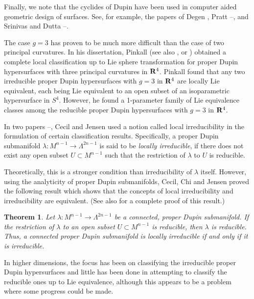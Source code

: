 \documentclass[12pt]{article}
\newtheorem{theorem}{Theorem}[section]
\begin{document}
{Finally, we note that the cyclides of Dupin have been
used in computer aided geometric design of surfaces.  See,
for example, the papers of Degen \cite{Degen}, Pratt 
\cite{Pr1}--\cite{Pr2}, and Srinivas and Dutta \cite{SD1}--\cite{SD4}.   


The case $g=3$ has proven to be much more difficult than the
case of two principal curvatures.  In his
dissertation, Pinkall \cite{P1} (see also
\cite{P3}, \cite{CC2} or \cite[pp. 168--190]{Cec9}) obtained
a complete local classification up to Lie
sphere transformation for proper Dupin hypersurfaces 
with three principal curvatures in ${\bf R}^4$. 
Pinkall found that any two irreducible
proper Dupin hypersurfaces with $g=3$ in ${\bf R}^4$ are locally
Lie equivalent, each being Lie equivalent to an open subset
of an isoparametric hypersurface in $S^4$.  However, he found
a 1-parameter family of Lie equivalence classes among the
reducible proper Dupin hypersurfaces with $g=3$ in ${\bf R}^4$.



In two papers \cite{CJ2}--\cite{CJ3}, Cecil and Jensen
used a notion called local irreducibility in the formulation of certain classification
results.  Specifically, a proper Dupin submanifold $\lambda: M^{n-1} \rightarrow \Lambda^{2n-1}$
is said to be {\em locally irreducible},
if there does not exist any open subset $U \subset M^{n-1}$ such that
the restriction of $\lambda$ to $U$ is reducible.

Theoretically, this is a stronger condition than irreducibility of $\lambda$ itself.  However,
using the analyticity of proper Dupin submanifolds, Cecil, Chi and Jensen \cite{CCJ2}
 proved the following
result which shows that the concepts of local irreducibility and irreducibility are equivalent.
(See also \cite[pp. 145--146]{Cec9} for a complete proof of this result.)

\begin{theorem}
\label{prop:4.2.10a} 
Let $\lambda: M^{n-1} \rightarrow \Lambda^{2n-1}$ be a connected, proper Dupin submanifold.  If the restriction of
$\lambda$ to an open subset $U \subset M^{n-1}$ is reducible, then $\lambda$ is reducible.  Thus, a connected
proper Dupin submanifold is locally irreducible if and only if it is irreducible.
\end{theorem}

In higher dimensions, the focus has been on classifying the irreducible 
proper Dupin hypersurfaces and little has
been done in attempting to classify the reducible ones up
to Lie equivalence, although this appears to be a problem
where some progress could be made.



}
\end{document}
